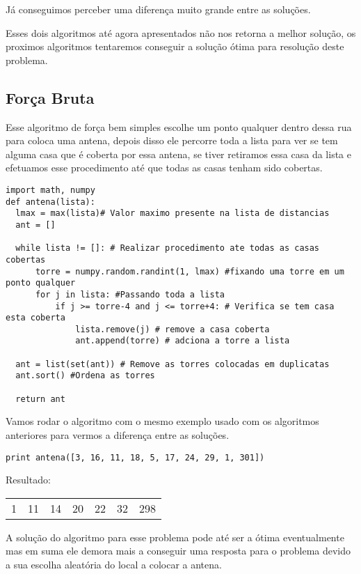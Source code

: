 \documentclass[11pt]{article}
\begin{document}
Já conseguimos perceber uma diferença muito grande entre as soluções.

Esses dois algoritmos até agora apresentados não nos retorna a melhor
solução, os proximos algoritmos tentaremos conseguir a solução ótima
para resolução deste problema.

\subsection{Força Bruta}
\label{sec-3-2}
\label{sec-3-2}

Esse algoritmo de força bem simples escolhe um ponto qualquer dentro
dessa rua para coloca uma antena, depois disso ele percorre toda a
lista para ver se tem alguma casa que é coberta por essa antena, se
tiver retiramos essa casa da lista e efetuamos esse procedimento até
que todas as casas tenham sido cobertas.


\begin{verbatim}
import math, numpy
def antena(lista):
  lmax = max(lista)# Valor maximo presente na lista de distancias
  ant = []

  while lista != []: # Realizar procedimento ate todas as casas cobertas
      torre = numpy.random.randint(1, lmax) #fixando uma torre em um ponto qualquer
      for j in lista: #Passando toda a lista
          if j >= torre-4 and j <= torre+4: # Verifica se tem casa esta coberta
              lista.remove(j) # remove a casa coberta
              ant.append(torre) # adciona a torre a lista

  ant = list(set(ant)) # Remove as torres colocadas em duplicatas
  ant.sort() #Ordena as torres

  return ant
\end{verbatim}

Vamos rodar o algoritmo com o mesmo exemplo usado com os algoritmos
anteriores para vermos a diferença entre as soluções.


\begin{verbatim}
print antena([3, 16, 11, 18, 5, 17, 24, 29, 1, 301])
\end{verbatim}

Resultado:
\begin{center}
\begin{tabular}{rrrrrrr}
1 & 11 & 14 & 20 & 22 & 32 & 298\\
\end{tabular}
\end{center}

A solução do algoritmo para esse problema pode até ser a ótima
eventualmente mas em suma ele demora mais a conseguir uma resposta
para o problema devido a sua escolha aleatória do local a colocar a
antena.
\end{document}
